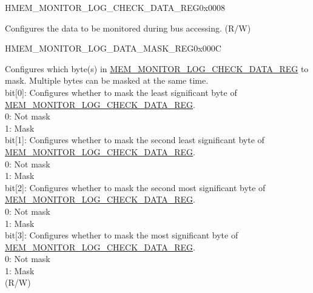 \begin{register}{H}{MEM\_MONITOR\_LOG\_CHECK\_DATA\_REG}{0x0008}\label{regdesc:MEMMONITORLOGCHECKDATAREG}
%
\regnewline%
\begin{regdesc}\begin{reglist}
\label{fielddesc:MEMMONITORLOGCHECKDATA}\item [MEM\_MONITOR\_LOG\_CHECK\_DATA] Configures the data to be monitored during bus accessing. (R/W)
\end{reglist}\end{regdesc}
\end{register}


\begin{register}{H}{MEM\_MONITOR\_LOG\_DATA\_MASK\_REG}{0x000C}\label{regdesc:MEMMONITORLOGDATAMASKREG}
%
%
\regnewline%
\begin{regdesc}\begin{reglist}
\label{fielddesc:MEMMONITORLOGDATAMASK}\item [MEM\_MONITOR\_LOG\_DATA\_MASK] Configures which byte(s) in \hyperref[regdesc:MEMMONITORLOGCHECKDATAREG]{MEM\_MONITOR\_LOG\_CHECK\_DATA\_REG} to mask. Multiple bytes can be masked at the same time. \\
bit[0]: Configures whether to mask the least significant byte of \hyperref[regdesc:MEMMONITORLOGCHECKDATAREG]{MEM\_MONITOR\_LOG\_CHECK\_DATA\_REG}.\\
0: Not mask \\
1: Mask\\
bit[1]: Configures whether to mask the second least significant byte of \hyperref[regdesc:MEMMONITORLOGCHECKDATAREG]{MEM\_MONITOR\_LOG\_CHECK\_DATA\_REG}. \\
0: Not mask \\
1: Mask\\
bit[2]: Configures whether to mask the second most significant byte of \hyperref[regdesc:MEMMONITORLOGCHECKDATAREG]{MEM\_MONITOR\_LOG\_CHECK\_DATA\_REG}. \\
0: Not mask \\
1: Mask\\
bit[3]: Configures whether to mask the most significant byte of \hyperref[regdesc:MEMMONITORLOGCHECKDATAREG]{MEM\_MONITOR\_LOG\_CHECK\_DATA\_REG}. \\
0: Not mask \\
1: Mask\\ 
(R/W)
\end{reglist}\end{regdesc}
\end{register}


